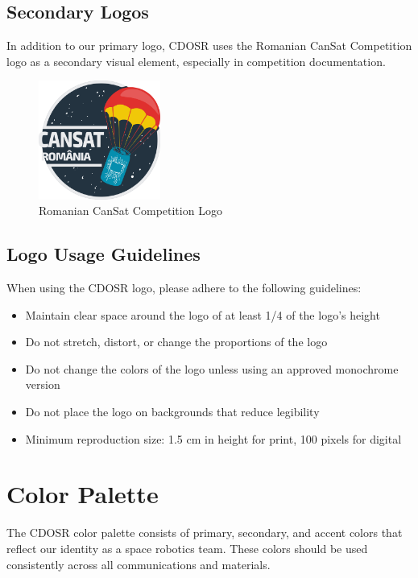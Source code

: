 \documentclass[11pt]{article}
\begin{document}
\subsection{Secondary Logos}

In addition to our primary logo, CDOSR uses the Romanian CanSat Competition logo as a secondary visual element, especially in competition documentation.

\begin{figure}[h]
    \centering
    \includegraphics[width=4cm]{img_CANSAT_RO.png}
    \caption{\small{Romanian CanSat Competition Logo}}
    \label{fig:secondary-logo}
\end{figure}

\subsection{Logo Usage Guidelines}

When using the CDOSR logo, please adhere to the following guidelines:

\begin{itemize}[leftmargin=1cm, itemindent=0.25cm, noitemsep, topsep=0pt, label=$\bullet$]
    \item Maintain clear space around the logo of at least 1/4 of the logo's height
    \item Do not stretch, distort, or change the proportions of the logo
    \item Do not change the colors of the logo unless using an approved monochrome version
    \item Do not place the logo on backgrounds that reduce legibility
    \item Minimum reproduction size: 1.5 cm in height for print, 100 pixels for digital
\end{itemize}

\section{Color Palette}

The CDOSR color palette consists of primary, secondary, and accent colors that reflect our identity as a space robotics team. These colors should be used consistently across all communications and materials.
\end{document}
